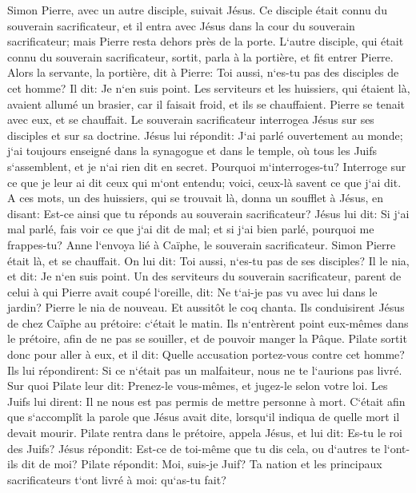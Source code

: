 \verse Simon Pierre, avec un autre disciple, suivait Jésus. Ce disciple était connu du souverain sacrificateur, et il entra avec Jésus dans la cour du souverain sacrificateur; 
\verse mais Pierre resta dehors près de la porte. L`autre disciple, qui était connu du souverain sacrificateur, sortit, parla à la portière, et fit entrer Pierre. 
\verse Alors la servante, la portière, dit à Pierre: Toi aussi, n`es-tu pas des disciples de cet homme? Il dit: Je n`en suis point. 
\verse Les serviteurs et les huissiers, qui étaient là, avaient allumé un brasier, car il faisait froid, et ils se chauffaient. Pierre se tenait avec eux, et se chauffait. 
\verse Le souverain sacrificateur interrogea Jésus sur ses disciples et sur sa doctrine. 
\verse Jésus lui répondit: J`ai parlé ouvertement au monde; j`ai toujours enseigné dans la synagogue et dans le temple, où tous les Juifs s`assemblent, et je n`ai rien dit en secret. 
\verse Pourquoi m`interroges-tu? Interroge sur ce que je leur ai dit ceux qui m`ont entendu; voici, ceux-là savent ce que j`ai dit. 
\verse A ces mots, un des huissiers, qui se trouvait là, donna un soufflet à Jésus, en disant: Est-ce ainsi que tu réponds au souverain sacrificateur? 
\verse Jésus lui dit: Si j`ai mal parlé, fais voir ce que j`ai dit de mal; et si j`ai bien parlé, pourquoi me frappes-tu? 
\verse Anne l`envoya lié à Caïphe, le souverain sacrificateur. 
\verse Simon Pierre était là, et se chauffait. On lui dit: Toi aussi, n`es-tu pas de ses disciples? Il le nia, et dit: Je n`en suis point. 
\verse Un des serviteurs du souverain sacrificateur, parent de celui à qui Pierre avait coupé l`oreille, dit: Ne t`ai-je pas vu avec lui dans le jardin? 
\verse Pierre le nia de nouveau. Et aussitôt le coq chanta. 
\verse Ils conduisirent Jésus de chez Caïphe au prétoire: c`était le matin. Ils n`entrèrent point eux-mêmes dans le prétoire, afin de ne pas se souiller, et de pouvoir manger la Pâque. 
\verse Pilate sortit donc pour aller à eux, et il dit: Quelle accusation portez-vous contre cet homme? 
\verse Ils lui répondirent: Si ce n`était pas un malfaiteur, nous ne te l`aurions pas livré. 
\verse Sur quoi Pilate leur dit: Prenez-le vous-mêmes, et jugez-le selon votre loi. Les Juifs lui dirent: Il ne nous est pas permis de mettre personne à mort. 
\verse C`était afin que s`accomplît la parole que Jésus avait dite, lorsqu`il indiqua de quelle mort il devait mourir. 
\verse Pilate rentra dans le prétoire, appela Jésus, et lui dit: Es-tu le roi des Juifs? 
\verse Jésus répondit: Est-ce de toi-même que tu dis cela, ou d`autres te l`ont-ils dit de moi? 
\verse Pilate répondit: Moi, suis-je Juif? Ta nation et les principaux sacrificateurs t`ont livré à moi: qu`as-tu fait? 
